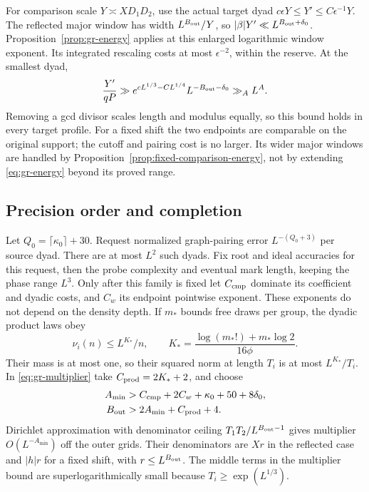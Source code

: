 For comparison scale \(Y\asymp XD_1D_2\), use the actual target
dyad \(c\epsilon Y\le Y'\le C\epsilon^{-1}Y\).
The reflected major window has width \(L^{B_{\rm out}}/Y\), so
\(|\beta|Y'\ll L^{B_{\rm out}+\delta_0}\).
Proposition~\ref{prop:gr-energy} applies at this enlarged logarithmic
window exponent. Its integrated rescaling costs at most
\(\epsilon^{-2}\), within the reserve. At the smallest dyad,
\begin{equation}\label{eq:smallest-dyad}
 \frac{Y'}{qP}\gg
 e^{cL^{1/3}-CL^{1/4}}L^{-B_{\rm out}-\delta_0}\gg_A L^A.
\end{equation}
Removing a gcd divisor scales length and modulus equally, so this
bound holds in every target profile.
For a fixed shift the two endpoints are comparable on the original
support; the cutoff and pairing cost is no larger. Its wider major
windows are handled by Proposition~\ref{prop:fixed-comparison-energy},
not by extending \eqref{eq:gr-energy} beyond its proved range.

\subsection{Precision order and completion}
Let \(Q_0=\lceil\kappa_0\rceil+30\).
Request normalized graph-pairing error \(L^{-(Q_0+3)}\) per source
dyad. There are at most \(L^2\) such dyads. Fix root and ideal
accuracies for this request, then the probe complexity and eventual
mark length, keeping the phase range \(L^3\).
Only after this family is fixed let \(C_{\rm cmp}\) dominate its
coefficient and dyadic costs, and \(C_w\) its endpoint pointwise
exponent. These exponents do not depend on the density depth.
If \(m_*\) bounds free draws per group, the dyadic product laws obey
\[
 \nu_i(n)\le L^{K_*}/n,\qquad
 K_*=\frac{\log(m_* !)+m_*\log2}{16\phi}.
\]
Their mass is at most one, so their squared norm at length \(T_i\)
is at most \(L^{K_*}/T_i\). In \eqref{eq:gr-multiplier} take
\(C_{\rm prod}=2K_*+2\), and choose
\begin{align}
 A_{\min}&>C_{\rm cmp}+2C_w+\kappa_0+50+8\delta_0,\notag\\
 B_{\rm out}&>2A_{\min}+C_{\rm prod}+4.\label{eq:outer-budget}
\end{align}
Dirichlet approximation with denominator ceiling
\(T_1T_2/L^{B_{\rm out}-1}\) gives multiplier \(O(L^{-A_{\min}})\)
off the outer grids. Their denominators are \(Xr\) in the reflected
case and \(|h|r\) for a fixed shift, with \(r\le L^{B_{\rm out}}\).
The middle terms in the multiplier bound are superlogarithmically
small because \(T_i\ge\exp(L^{1/3})\).


